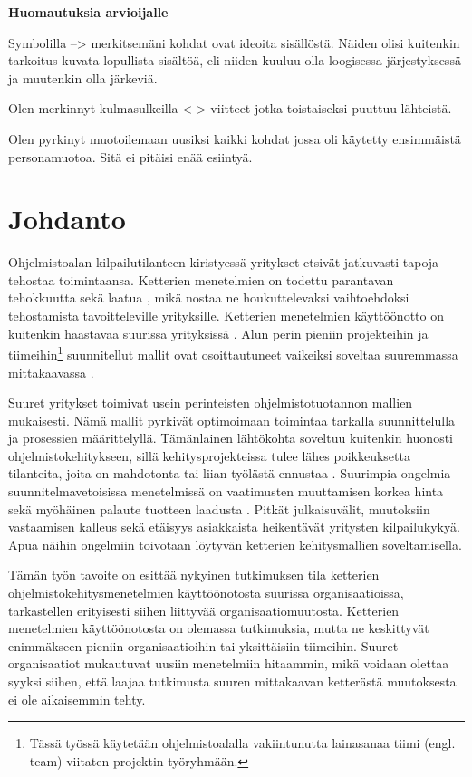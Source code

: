 
\textbf{Huomautuksia arvioijalle}

Symbolilla --> merkitsemäni kohdat ovat ideoita sisällöstä. Näiden olisi
kuitenkin tarkoitus kuvata lopullista sisältöä, eli niiden kuuluu olla
loogisessa järjestyksessä ja muutenkin olla järkeviä.

Olen merkinnyt kulmasulkeilla < > viitteet jotka toistaiseksi puuttuu lähteistä.

Olen pyrkinyt muotoilemaan uusiksi kaikki kohdat jossa oli käytetty ensimmäistä
personamuotoa. Sitä ei pitäisi enää esiintyä.

\newpage

\section{Johdanto}

Ohjelmistoalan kilpailutilanteen kiristyessä yritykset etsivät jatkuvasti tapoja
tehostaa toimintaansa. Ketterien menetelmien on todettu parantavan tehokkuutta
sekä laatua \citep{Livermore2008}, mikä nostaa ne houkuttelevaksi vaihtoehdoksi
tehostamista tavoitteleville yrityksille. Ketterien menetelmien käyttöönotto on
kuitenkin haastavaa suurissa yrityksissä \citep{Dyba2009}. Alun perin pieniin
projekteihin ja tiimeihin\footnote{Tässä työssä käytetään ohjelmistoalalla
vakiintunutta lainasanaa tiimi (engl. team) viitaten projektin työryhmään.}
suunnitellut mallit ovat osoittautuneet vaikeiksi soveltaa suuremmassa
mittakaavassa \citep{Boehm2005}.

Suuret yritykset toimivat usein perinteisten ohjelmistotuotannon mallien
mukaisesti. Nämä mallit pyrkivät optimoimaan toimintaa tarkalla suunnittelulla
ja prosessien määrittelyllä. Tämänlainen lähtökohta soveltuu kuitenkin huonosti
ohjelmistokehitykseen, sillä kehitysprojekteissa tulee lähes poikkeuksetta
tilanteita, joita on mahdotonta tai liian työlästä ennustaa \citep{Schwaber2002}.
Suurimpia ongelmia suunnitelmavetoisissa menetelmissä on vaatimusten muuttamisen
korkea hinta sekä myöhäinen palaute tuotteen laadusta \citep{Petersen2010}.
Pitkät julkaisuvälit, muutoksiin vastaamisen kalleus sekä etäisyys asiakkaista
heikentävät yritysten kilpailukykyä. Apua näihin ongelmiin toivotaan löytyvän
ketterien kehitysmallien soveltamisella.

Tämän työn tavoite on esittää nykyinen tutkimuksen tila ketterien
ohjelmistokehitysmenetelmien käyttöönotosta suurissa organisaatioissa,
tarkastellen erityisesti siihen liittyvää organisaatiomuutosta. Ketterien
menetelmien käyttöönotosta on olemassa tutkimuksia, mutta ne keskittyvät
enimmäkseen pieniin organisaatioihin tai yksittäisiin tiimeihin. Suuret
organisaatiot mukautuvat uusiin menetelmiin hitaammin, mikä voidaan olettaa
syyksi siihen, että laajaa tutkimusta suuren mittakaavan ketterästä muutoksesta
ei ole aikaisemmin tehty.

